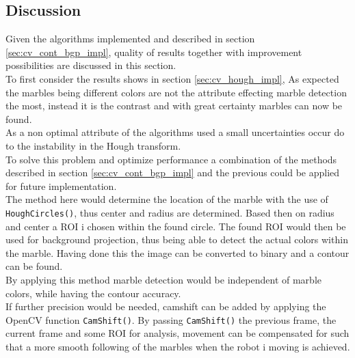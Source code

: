 \documentclass[../../../main.tex]{subfiles}
\begin{document}
\subsection{Discussion}
\label{sec:cv_discussion}
Given the algorithms implemented and described in section \ref{sec:cv_cont_bgp_impl}, quality of results together with improvement possibilities are discussed in this section.\\

To first consider the results shows in section \ref{sec:cv_hough_impl}, 
As expected the marbles being different colors are not the attribute effecting marble detection the most, instead it is the contrast and with great certainty marbles can now be found.\\
As a non optimal attribute of the algorithms used a small uncertainties occur do to the instability in the Hough transform.\\
To solve this problem and optimize performance a combination of the methods described in section \ref{sec:cv_cont_bgp_impl} and the previous could be applied for future implementation.\\
The method here would determine the location of the marble with the use of \texttt{HoughCircles()}, thus center and radius are determined.
Based then on radius and center a ROI i chosen within the found circle. The found ROI would then be used for background projection, 
thus being able to detect the actual colors within the marble. Having done this the image can be converted to binary and a contour can be found.\\
By applying this method marble detection would be independent of marble colors, while having the contour accuracy.\\
If further precision would be needed, camshift can be added by applying the OpenCV function \texttt{CamShift()}. 
By passing \texttt{CamShift()} the previous frame, the current frame and some ROI for analysis, movement can be compensated for such that a more smooth
following of the marbles when the robot i moving is achieved.\\ 
\end{document}
